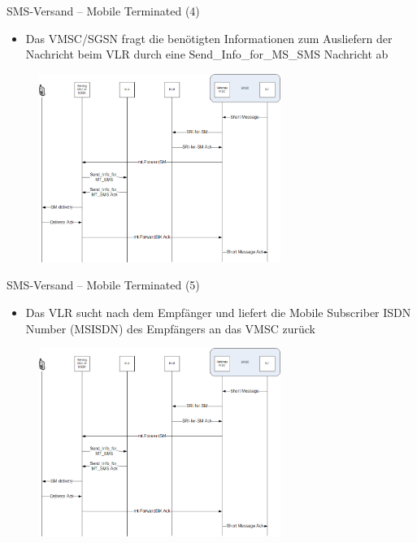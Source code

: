\documentclass{beamer}
\begin{document}
\begin{frame}{SMS-Versand -- Mobile Terminated (4)}

	\begin{itemize}
		\item Das VMSC/SGSN fragt die benötigten Informationen zum Ausliefern der Nachricht beim VLR 
			durch eine Send\_Info\_for\_MS\_SMS Nachricht ab
	\end{itemize}
	\begin{figure}[htm]
		\includegraphics[width=0.7\textwidth]{img/mt-forward-sm-4.png}
	\end{figure}
\end{frame}

\begin{frame}{SMS-Versand -- Mobile Terminated (5)}

	\begin{itemize}
		\item Das VLR sucht nach dem 
			Empfänger und liefert die Mobile Subscriber ISDN Number (MSISDN) des Empfängers an 
			das VMSC zurück
	\end{itemize}
	\begin{figure}[htm]
		\includegraphics[width=0.7\textwidth]{img/mt-forward-sm-5.png}
	\end{figure}
\end{frame}
\end{document}

